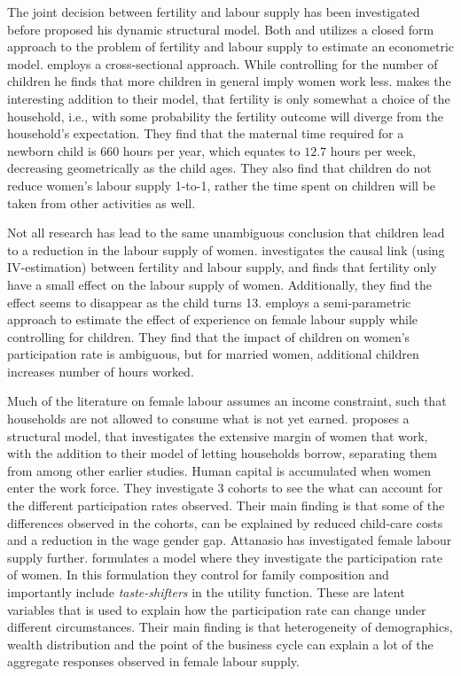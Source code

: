 The joint decision between fertility and labour supply has been investigated before \textcite{francesconi_joint_2002} proposed his dynamic structural model. Both \textcite{moffitt_estimation_1984} and \textcite{hotz_empirical_1988} utilizes a closed form approach to the problem of fertility and labour supply to estimate an econometric model. \textcite{moffitt_estimation_1984} employs a cross-sectional approach. While controlling for the number of children he finds that more children in general imply women work less. \textcite{hotz_empirical_1988} makes the interesting addition to their model, that fertility is only somewhat a choice of the household, i.e., with some probability the fertility outcome will diverge from the household's expectation. They find that the maternal time required for a newborn child is 660 hours per year, which equates to $12.7$ hours per week, decreasing geometrically as the child ages. They also find that children do not reduce women's labour supply 1-to-1, rather the time spent on children will be taken from other activities as well.

Not all research has lead to the same unambiguous conclusion that children lead to a reduction in the labour supply of women.   \textcite{angrist_children_1996}  investigates the causal link (using IV-estimation) between fertility and labour supply, and finds that fertility only have a small effect on the labour supply of women. Additionally, they find the effect seems to disappear as the child turns 13.  \textcite{altug_effect_1998} employs a semi-parametric approach to estimate the effect of experience on female labour supply while controlling for children. They find that the impact of children on women's participation rate is ambiguous, but for married women, additional children increases number of hours worked.

Much of the literature on female labour assumes an income constraint, such that households are not allowed to consume what is not yet earned.  \textcite{attanasio_explaining_2008} proposes a structural model, that investigates the extensive margin of women that work, with the addition to their model  of letting households borrow, separating them from \textcite{francesconi_joint_2002} among other earlier studies. Human capital is accumulated when women enter the work force. They investigate 3 cohorts to see the what can account for the different participation rates observed. Their main finding is that some of the differences observed in the cohorts, can be explained by reduced child-care costs and a reduction in the wage gender gap. Attanasio has investigated female labour supply further.  \textcite{attanasio_aggregating_2018} formulates a model where they investigate the participation rate of women. In this formulation they control for family composition and importantly include \textit{taste-shifters} in the utility function. These are latent variables that is used to explain how the participation rate can change under different circumstances. Their main finding is that heterogeneity of demographics, wealth distribution and the point of the business cycle can explain a lot of the aggregate responses observed in female labour supply.

